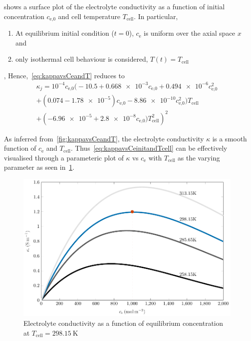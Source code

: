  shows  a surface  plot of the  electrolyte conductivity
as  a function  of  initial concentration  $c_\text{e,0}$  and cell  temperature
$T_\text{cell}$. In particular,
\begin{enumerate}%
    \item At  equilibrium  initial condition ($t=0$), $c_\text{e}$ is uniform over the axial space $x$ and
    \item only isothermal cell behaviour is considered, \ie{} $T(t) = T_\text{cell}$
\end{enumerate},
Hence,~\cref{eq:kappavsCeandT} reduces to
\begin{multline}\label{eq:kappavsCeinitandTcell}
    \kappa_j =  10^{-4} c_\text{e,0} \bigl(-10.5 + \num{0.668e-3} c_\text{e,0} + \num{0.494e-6}  c_\text{e,0}^2\\
        + (0.074 - \num{1.78e-5}) c_\text{e,0} - \num{8.86e-10}
    c_\text{e,0}^2 \bigr)T_\text{cell}\\
	+ \left(\num{-6.96e-5} + \num{2.8e-8} c_\text{e,0})T_\text{cell}^2\right)^2
\end{multline}

As   inferred   from~\cref{fig:kappavsCeandT},  the   electrolyte   conductivity
$\kappa$   is   a  smooth   function   of   $c_\text{e}$  and   $T_\text{cell}$.
Thus~\cref{eq:kappavsCeinitandTcell}  can be  effectively  visualised through  a
parameteric plot of $\kappa$ vs $c_\text{e}$ with $T_\text{cell}$ as the varying
parameter as seen in~\cref{fig:kappavsce}.

\begin{figure}[tb]
    \centering
    \includegraphics[width=\textwidth]{4/figures/m2t_kappa_ce_parametric_T.pdf}
    \caption[]
    {Electrolyte conductivity as a function of equilibrium concentration at
    $T_\text{cell} = \SI{298.15}{\kelvin}$}
    \label{fig:kappavsce}
\end{figure}

